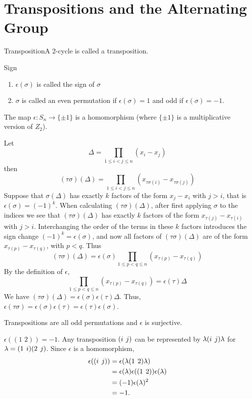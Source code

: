 \documentclass{report}
\newcommand{\mprop}[2]{\begin{Prop}{#1}{}#2\end{Prop}}
\newcommand{\dfn}[2]{\begin{Definition}[colbacktitle=red!75!black]{#1}{}#2\end{Definition}}
\newenvironment{myproof}[1][\proofname]{%
	\proof[\bfseries #1: ]%
}{\endproof}
\newcommand{\eps}{\epsilon}
\begin{document}
\section{Transpositions and the Alternating Group}
\dfn{Transposition}{A 2-cycle is called a transposition.}
\dfn{Sign}{\begin{enumerate}
    \item $\eps(\sigma)$ is called the sign of $\sigma$
    \item $\sigma$ is called an even permutation if $\eps (\sigma)= 1$ and odd if $\eps(\sigma ) = -1$.
\end{enumerate}}

\mprop{}{The map $\eps : S_n \to \{\pm 1\}$ is a homomorphism (where $\{\pm 1\}$ is a multiplicative version of $Z_2$). }
\begin{myproof}
    Let $$\Delta = \prod_{1 \leq i < j \leq n} (x_i - x_j)$$
    then
    $$(\tau \sigma)(\Delta) = \prod_{1 \leq i < j \leq n} (x_{\tau \sigma (i)} - x_{\tau \sigma (j)})$$
    Suppose that $\sigma (\Delta)$ has exactly $k$ factors of the form $x_j -x_i$ with $j> i$, that is $\eps (\sigma) = (-1)^k$. When calculating $(\tau \sigma)(\Delta)$, after first applying $\sigma$ to the indices we see that $(\tau \sigma )(\Delta)$ has exactly $k$ factors of the form $x_{\tau (j)} - x_{\tau (i)}$ with $j>i$. Interchanging the order of the terms in these $k$ factors introduces the sign change $(-1)^k = \eps (\sigma)$, and now all factors of $(\tau \sigma)(\Delta)$ are of the form $x_{\tau(p)} - x_{\tau(q)}$, with $p< q$. Thus
    $$(\tau \sigma )(\Delta) = \eps (\sigma) \prod_{1 \leq p < q \leq n} (x_{\tau (p)} - x_{\tau (q)})$$
    By the definition of $\eps$, 
    $$\prod_{1 \leq p < q \leq n} (x_{\tau (p)} - x_{\tau (q)}) = \eps (\tau) \Delta$$
    We have $(\tau \sigma)(\Delta) = \eps(\sigma) \eps(\tau)\Delta$. Thus, $\eps(\tau \sigma)= \eps(\sigma)\eps(\tau) = \eps(\tau) \eps(\sigma)$. 
\end{myproof}
\mprop{}{Transpositions are all odd permutations and $\eps$ is surjective.}
\begin{myproof}
    $\eps((1 \hspace{4pt} 2)) = -1$. Any transposition $(i \hspace{4 pt} j)$ can be represented by $\lambda (i \hspace{4 pt} j) \lambda$ for $\lambda = (1 \hspace{4 pt} i) ( 2 \hspace{4 pt} j)$. Since $\eps$ is a homomorphism, 
    \begin{align*}
        \eps((i \hspace{4pt} j)) &= \eps(\lambda ( 1 \hspace{4 pt} 2) \lambda)\\
        &= \eps (\lambda) \eps ((1 \hspace{4 pt} 2))\eps (\lambda)\\
        &= (-1) \eps(\lambda)^2\\
        & = -1. 
    \end{align*}
\end{myproof}
\end{document}
